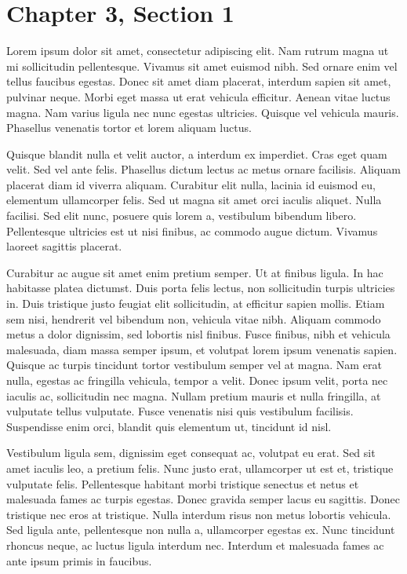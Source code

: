 \section{Chapter 3, Section 1}

Lorem ipsum dolor sit amet, consectetur adipiscing elit. Nam rutrum magna ut mi sollicitudin pellentesque. Vivamus sit amet euismod nibh. Sed ornare enim vel tellus faucibus egestas. Donec sit amet diam placerat, interdum sapien sit amet, pulvinar neque. Morbi eget massa ut erat vehicula efficitur. Aenean vitae luctus magna. Nam varius ligula nec nunc egestas ultricies. Quisque vel vehicula mauris. Phasellus venenatis tortor et lorem aliquam luctus.

Quisque blandit nulla et velit auctor, a interdum ex imperdiet. Cras eget quam velit. Sed vel ante felis. Phasellus dictum lectus ac metus ornare facilisis. Aliquam placerat diam id viverra aliquam. Curabitur elit nulla, lacinia id euismod eu, elementum ullamcorper felis. Sed ut magna sit amet orci iaculis aliquet. Nulla facilisi. Sed elit nunc, posuere quis lorem a, vestibulum bibendum libero. Pellentesque ultricies est ut nisi finibus, ac commodo augue dictum. Vivamus laoreet sagittis placerat.

Curabitur ac augue sit amet enim pretium semper. Ut at finibus ligula. In hac habitasse platea dictumst. Duis porta felis lectus, non sollicitudin turpis ultricies in. Duis tristique justo feugiat elit sollicitudin, at efficitur sapien mollis. Etiam sem nisi, hendrerit vel bibendum non, vehicula vitae nibh. Aliquam commodo metus a dolor dignissim, sed lobortis nisl finibus. Fusce finibus, nibh et vehicula malesuada, diam massa semper ipsum, et volutpat lorem ipsum venenatis sapien. Quisque ac turpis tincidunt tortor vestibulum semper vel at magna. Nam erat nulla, egestas ac fringilla vehicula, tempor a velit. Donec ipsum velit, porta nec iaculis ac, sollicitudin nec magna. Nullam pretium mauris et nulla fringilla, at vulputate tellus vulputate. Fusce venenatis nisi quis vestibulum facilisis. Suspendisse enim orci, blandit quis elementum ut, tincidunt id nisl.

Vestibulum ligula sem, dignissim eget consequat ac, volutpat eu erat. Sed sit amet iaculis leo, a pretium felis. Nunc justo erat, ullamcorper ut est et, tristique vulputate felis. Pellentesque habitant morbi tristique senectus et netus et malesuada fames ac turpis egestas. Donec gravida semper lacus eu sagittis. Donec tristique nec eros at tristique. Nulla interdum risus non metus lobortis vehicula. Sed ligula ante, pellentesque non nulla a, ullamcorper egestas ex. Nunc tincidunt rhoncus neque, ac luctus ligula interdum nec. Interdum et malesuada fames ac ante ipsum primis in faucibus.

